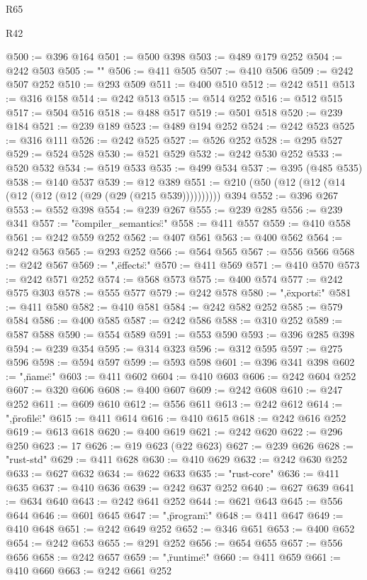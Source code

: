 \begin{lexlean}{R65}
\begin{lexlean}{R42}
\begin{coremodule}
{{{{{{{{{{{{{{{{{{{{{{{{{{{{{{{{{{{{{{{{{{{{{{{{{{{{{{{{{{{{{{{{{{{{{{{{{{{{{{{{{{{{{{{{{{{{{{{{{{{{{{{{{{{{{{{{{{{{{{{{{{{{{{{{{{{{{{{{{{{{{{{{{{{{{{{{{{{{{{{{{{{{{{{{{{{{{{{{{{{{{{{@500 := @396 @164
@501 := @500 @398
@503 := @489 @179 @252
@504 := @242 @503
@505 := "\n"
@506 := @411 @505
@507 := @410 @506
@509 := @242 @507 @252
@510 := @293 @509
@511 := @400 @510
@512 := @242 @511
@513 := @316 @158
@514 := @242 @513
@515 := @514 @252
@516 := @512 @515
@517 := @504 @516
@518 := @488 @517
@519 := @501 @518
@520 := @239 @184
@521 := @239 @189
@523 := @489 @194 @252
@524 := @242 @523
@525 := @316 @111
@526 := @242 @525
@527 := @526 @252
@528 := @295 @527
@529 := @524 @528
@530 := @521 @529
@532 := @242 @530 @252
@533 := @520 @532
@534 := @519 @533
@535 := @499 @534
@537 := @395 (@485 @535)
@538 := @140 @537
@539 := @12 @389
@551 := @210 (@50 (@12 (@12 (@14 (@12 (@12 (@12 (@29 (@29 (@215 @539)))))))))) @394
@552 := @396 @267
@553 := @552 @398
@554 := @239 @267
@555 := @239 @285
@556 := @239 @341
@557 := "{\"compiler_semantics\":"
@558 := @411 @557
@559 := @410 @558
@561 := @242 @559 @252
@562 := @407 @561
@563 := @400 @562
@564 := @242 @563
@565 := @293 @252
@566 := @564 @565
@567 := @556 @566
@568 := @242 @567
@569 := ",\"effects\":"
@570 := @411 @569
@571 := @410 @570
@573 := @242 @571 @252
@574 := @568 @573
@575 := @400 @574
@577 := @242 @575 @303
@578 := @555 @577
@579 := @242 @578
@580 := ",\"exports\":"
@581 := @411 @580
@582 := @410 @581
@584 := @242 @582 @252
@585 := @579 @584
@586 := @400 @585
@587 := @242 @586
@588 := @310 @252
@589 := @587 @588
@590 := @554 @589
@591 := @553 @590
@593 := @396 @285 @398
@594 := @239 @354
@595 := @314 @323
@596 := @312 @595
@597 := @275 @596
@598 := @594 @597
@599 := @593 @598
@601 := @396 @341 @398
@602 := ",\"name\":"
@603 := @411 @602
@604 := @410 @603
@606 := @242 @604 @252
@607 := @320 @606
@608 := @400 @607
@609 := @242 @608
@610 := @247 @252
@611 := @609 @610
@612 := @556 @611
@613 := @242 @612
@614 := ",\"profile\":"
@615 := @411 @614
@616 := @410 @615
@618 := @242 @616 @252
@619 := @613 @618
@620 := @400 @619
@621 := @242 @620
@622 := @296 @250
@623 := 17
@626 := @19 @623 (@22 @623)
@627 := @239 @626
@628 := "rust-std"
@629 := @411 @628
@630 := @410 @629
@632 := @242 @630 @252
@633 := @627 @632
@634 := @622 @633
@635 := "rust-core"
@636 := @411 @635
@637 := @410 @636
@639 := @242 @637 @252
@640 := @627 @639
@641 := @634 @640
@643 := @242 @641 @252
@644 := @621 @643
@645 := @556 @644
@646 := @601 @645
@647 := ",\"program\":"
@648 := @411 @647
@649 := @410 @648
@651 := @242 @649 @252
@652 := @346 @651
@653 := @400 @652
@654 := @242 @653
@655 := @291 @252
@656 := @654 @655
@657 := @556 @656
@658 := @242 @657
@659 := ",\"runtime\":"
@660 := @411 @659
@661 := @410 @660
@663 := @242 @661 @252
}}}}}}}}}}}}}}}}}}}}}}}}}}}}}}}}}}}}}}}}}}}}}}}}}}}}}}}}}}}}}}}}}}}}}}}}}}}}}}}}}}}}}}}}}}}}}}}}}}}}}}}}}}}}}}}}}}}}}}}}}}}}}}}}}}}}}}}}}}}}}}}}}}}}}}}}}}}}}}}}}}}}}}}}}}}}}}}}}}}}}}}}
\end{coremodule}
\end{lexlean}
\end{lexlean}
